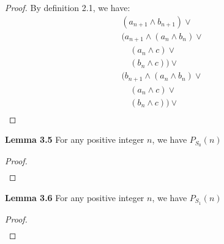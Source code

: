 \documentclass{article}
\begin{document}
\begin{proof}
	       By definition 2.1, we have: \\
	       
	       \begin{align*}
	       	& (a_{n+1} \land b_{n+1}) \lor \\ 
	       	& (a_{n+1} \land (a_{n} \land b_{n}) \lor \\  
	       	& \quad (a_{n} \land c) \lor \\
	       	& \quad (b_{n} \land c) )\lor \\ 
	       	& (b_{n+1} \land (a_{n} \land b_{n}) \lor \\  
	       	& \quad (a_{n} \land c) \lor \\
	       	& \quad (b_{n} \land c) )\lor \\ 
	       \end{align*}

	      
	      
	 
	 
	
\end{proof}

\noindent \textbf{Lemma 3.5} For any positive integer $n$, we have $ P_{S_0}(n) $
\begin{proof}
	\begin{align*}
	\end{align*}
\end{proof}

\noindent \textbf{Lemma 3.6} For any positive integer $n$, we have $ P_{S_1}(n) $
\begin{proof}
	\begin{align*}
	\end{align*}
\end{proof}
\end{document}
